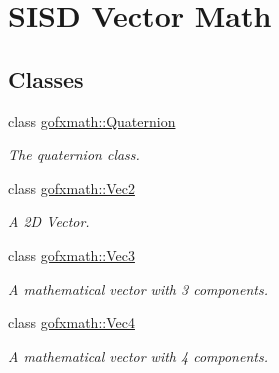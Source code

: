\hypertarget{group___s_i_s_d_vec_math}{}\section{S\+I\+S\+D Vector Math}
\label{group___s_i_s_d_vec_math}
\subsection*{Classes}
\begin{DoxyCompactItemize}
\item 
class \hyperlink{classgofxmath_1_1_quaternion}{gofxmath\+::\+Quaternion}
\begin{DoxyCompactList}\small\item\em The quaternion class. \end{DoxyCompactList}\item 
class \hyperlink{classgofxmath_1_1_vec2}{gofxmath\+::\+Vec2}
\begin{DoxyCompactList}\small\item\em A 2\+D Vector. \end{DoxyCompactList}\item 
class \hyperlink{classgofxmath_1_1_vec3}{gofxmath\+::\+Vec3}
\begin{DoxyCompactList}\small\item\em A mathematical vector with 3 components. \end{DoxyCompactList}\item 
class \hyperlink{classgofxmath_1_1_vec4}{gofxmath\+::\+Vec4}
\begin{DoxyCompactList}\small\item\em A mathematical vector with 4 components. \end{DoxyCompactList}\end{DoxyCompactItemize}
